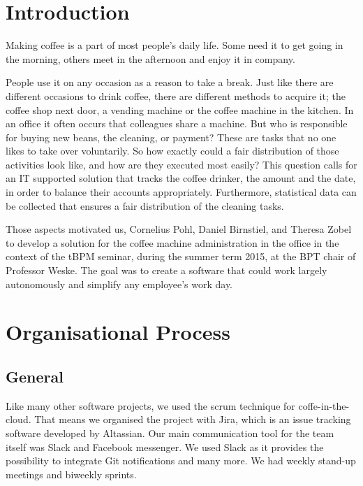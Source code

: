 \newpage
\section{Introduction}\label{introduction}

Making coffee is a part of most people's daily life. Some need it to get
going in the morning, others meet in the afternoon and enjoy it in
company.

People use it on any occasion as a reason to take a break. Just like
there are different occasions to drink coffee, there are different
methods to acquire it; the coffee shop next door, a vending machine or
the coffee machine in the kitchen. In an office it often occurs that
colleagues share a machine. But who is responsible for buying new beans,
the cleaning, or payment? These are tasks that no one likes to take over
voluntarily. So how exactly could a fair distribution of those
activities look like, and how are they executed most easily? This
question calls for an IT supported solution that tracks the coffee
drinker, the amount and the date, in order to balance their accounts
appropriately. Furthermore, statistical data can be collected that
ensures a fair distribution of the cleaning tasks.

Those aspects motivated us, Cornelius Pohl, Daniel Birnstiel, and
Theresa Zobel to develop a solution for the coffee machine
administration in the office in the context of the tBPM seminar, during
the summer term 2015, at the BPT chair of Professor Weske. The goal was
to create a software that could work largely autonomously and simplify
any employee's work day.

\newpage
\section{Organisational Process}\label{organisational-process}

\subsection{General}\label{general}

Like many other software projects, we used the scrum technique for
coffe-in-the-cloud. That means we organised the project with Jira, which
is an issue tracking software developed by Altassian. Our main
communication tool for the team itself was Slack and Facebook messenger.
We used Slack as it provides the possibility to integrate Git
notifications and many more. We had weekly stand-up meetings and
biweekly sprints.

